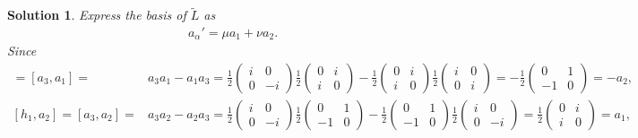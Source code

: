 \documentclass[UTF8,10pt,a4paper]{article}
\theoremstyle{Problem}
\theoremstyle{Solution}
\newtheorem*{sol}{Solution}
\begin{document}
\begin{sol}
    Express the basis of $\tilde{L}$ as
    \begin{align}
        a_{\alpha}'=\mu a_1+\nu a_2.
    \end{align}
    Since
    \begin{align}
        [h_1,a_1]=[a_3,a_1]=&a_3a_1-a_1a_3=\frac{1}{2}\left(\begin{matrix}
            i&0\\
            0&-i
        \end{matrix}\right)\frac{1}{2}\left(\begin{matrix}
            0&i\\
            i&0
        \end{matrix}\right)-\frac{1}{2}\left(\begin{matrix}
            0&i\\
            i&0
        \end{matrix}\right)\frac{1}{2}\left(\begin{matrix}
            i&0\\
            0&i
        \end{matrix}\right)=-\frac{1}{2}\left(\begin{matrix}
            0&1\\
            -1&0
        \end{matrix}\right)=-a_2,\\
        [h_1,a_2]=[a_3,a_2]=&a_3a_2-a_2a_3=\frac{1}{2}\left(\begin{matrix}
            i&0\\
            0&-i
        \end{matrix}\right)\frac{1}{2}\left(\begin{matrix}
            0&1\\
            -1&0
        \end{matrix}\right)-\frac{1}{2}\left(\begin{matrix}
            0&1\\
            -1&0
        \end{matrix}\right)\frac{1}{2}\left(\begin{matrix}
            i&0\\
            0&-i
        \end{matrix}\right)=\frac{1}{2}\left(\begin{matrix}
            0&i\\
            i&0
        \end{matrix}\right)=a_1,
    \end{align}

\end{sol}
\end{document}
